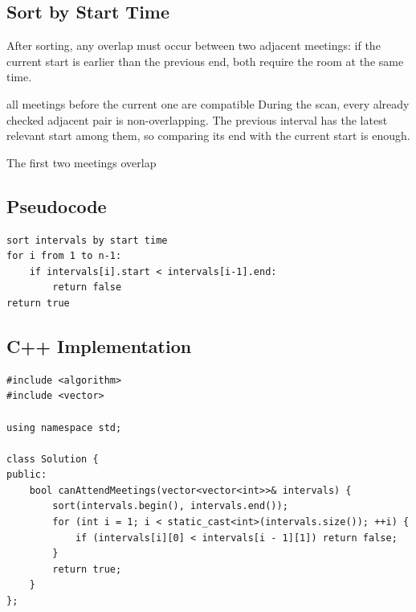 \subsection{Sort by Start Time}
After sorting, any overlap must occur between two adjacent meetings: if the
current start is earlier than the previous end, both require the room at the
same time.

\begin{invariantbox}{all meetings before the current one are compatible}
During the scan, every already checked adjacent pair is non-overlapping. The
previous interval has the latest relevant start among them, so comparing its
end with the current start is enough.
\end{invariantbox}

\begin{visualbox}{The first two meetings overlap}
\centering
{}
\end{visualbox}

\subsection{Pseudocode}
\begin{lstlisting}[style=pseudocode]
sort intervals by start time
for i from 1 to n-1:
    if intervals[i].start < intervals[i-1].end:
        return false
return true
\end{lstlisting}

\subsection{C++ Implementation}
\begin{lstlisting}[style=compactcode,caption={Complete C++ solution: Meeting Rooms}]
#include <algorithm>
#include <vector>

using namespace std;

class Solution {
public:
    bool canAttendMeetings(vector<vector<int>>& intervals) {
        sort(intervals.begin(), intervals.end());
        for (int i = 1; i < static_cast<int>(intervals.size()); ++i) {
            if (intervals[i][0] < intervals[i - 1][1]) return false;
        }
        return true;
    }
};
\end{lstlisting}

